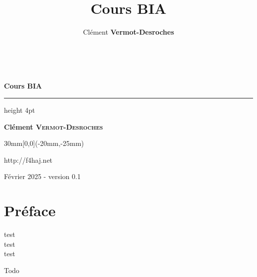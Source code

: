 \documentclass[a4paper,12pt,oneside]{report} %
\title{Cours BIA} %
\author{Clément \textbf{Vermot-Desroches}} %
\begin{document}
	
	\begin{titlepage}
		\begin{center} 
			~
			\vfill
			\begin{flushleft}
				\huge \textbf{Cours BIA}
			\end{flushleft}
			\par
			\hrule height 4pt
			\par
			\begin{flushright}
				\Large \textbf{Clément \textsc{Vermot-Desroches}}
				\par
			\end{flushright}
			\vspace{2cm}
			\vfill
			\vfill
		\end{center}
			\begin{textblock*}{30mm}[0,0](-20mm,-25mm)
			\end{textblock*}
		\begin{center}
			http://f4haj.net
			
			Février 2025 - version 0.1
		\end{center} 
	\end{titlepage} 	
	

	\tableofcontents
	\newpage	
	
	\section{Préface}
	\alert{test\\test\\test}

	Todo


\end{document}
